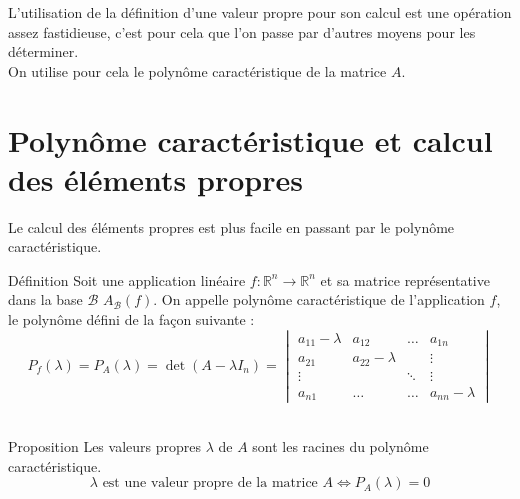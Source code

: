 L'utilisation de la définition d'une valeur propre pour son calcul est une opération assez fastidieuse, c'est pour cela que l'on passe par d'autres moyens pour les déterminer.\\
On utilise pour cela le polynôme caractéristique de la matrice $A$.
\section{Polynôme caractéristique et calcul des éléments propres}
Le calcul des éléments propres est plus facile en passant par le polynôme caractéristique.
\begin{bclogo}[couleur=blue!30,couleurBord=blue,arrondi=0.1,logo=\bcbook,ombre=true]{Définition}
Soit une application linéaire $f:\mathbb{R}^n\to\mathbb{R}^n$ et sa matrice représentative dans la base $\mathscr{B}$ $A_{\mathscr{B}}(f)$.
On appelle polynôme caractéristique de l'application $f$, le polynôme défini de la façon suivante :
$$P_{f}(\lambda)=P_{A}(\lambda)=\det(A-\lambda I_{n})=\begin{vmatrix}
a_{11}-\lambda & a_{12} & \hdots & a_{1n}\\
a_{21} & a_{22}-\lambda &&\vdots \\
\vdots & & \ddots & \vdots\\
a_{n1} &\hdots&\hdots& a_{nn}-\lambda
\end{vmatrix}$$
\\
\end{bclogo}

\begin{bclogo}[couleur=green!30,couleurBord=green,logo=\bccle ,ombre=true,arrondi=0.1]{Proposition}
Les valeurs propres $\lambda$ de $A$ sont les racines du polynôme caractéristique.
$$\lambda \text{ est une valeur propre de la matrice } A \Leftrightarrow P_A(\lambda) = 0$$
\end{bclogo}

